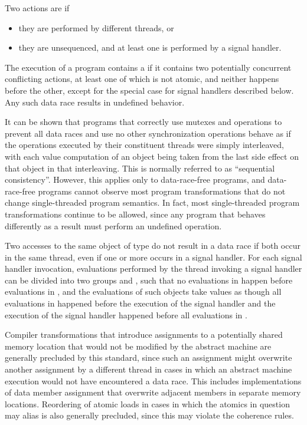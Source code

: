 \pnum
{}%
Two actions are  if
\begin{itemize}
\item they are performed by different threads, or
\item they are unsequenced, and at least one is performed by a signal handler.
\end{itemize}
%
The execution of a program contains a  if it contains two
potentially concurrent conflicting actions, at least one of which is not atomic,
and neither happens before the other,
except for the special case for signal handlers described below.
Any such data race results in undefined
behavior. \begin{note} It can be shown that programs that correctly use mutexes
and  operations to prevent all data races and use no
other synchronization operations behave as if the operations executed by their
constituent threads were simply interleaved, with each
%
value computation of an
object being taken from the last
%
side effect on that object in that
interleaving. This is normally referred to as ``sequential consistency''.
However, this applies only to data-race-free programs, and data-race-free
programs cannot observe most program transformations that do not change
single-threaded program semantics. In fact, most single-threaded program
transformations continue to be allowed, since any program that behaves
differently as a result must perform an undefined operation. \end{note}

\pnum
Two accesses to the same object of type  do not
result in a data race if both occur in the same thread, even if one or more
occurs in a signal handler. For each signal handler invocation, evaluations
performed by the thread invoking a signal handler can be divided into two
groups  and , such that no evaluations in
 happen before evaluations in , and the
evaluations of such  objects take values as though
all evaluations in  happened before the execution of the signal
handler and the execution of the signal handler happened before all evaluations
in .

\pnum
\begin{note} Compiler transformations that introduce assignments to a potentially
shared memory location that would not be modified by the abstract machine are
generally precluded by this standard, since such an assignment might overwrite
another assignment by a different thread in cases in which an abstract machine
execution would not have encountered a data race. This includes implementations
of data member assignment that overwrite adjacent members in separate memory
locations. Reordering of atomic loads in cases in which the atomics in question
may alias is also generally precluded, since this may violate the coherence
rules. \end{note}

